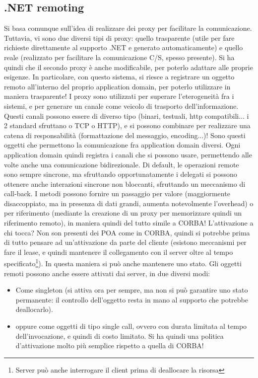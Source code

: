 \subsection{.NET remoting}
Si basa comunque sull'idea di realizzare dei proxy per facilitare la comunicazione.
Tuttavia, vi sono due diversi tipi di proxy: quello trasparente (utile per fare richieste direttamente al supporto .NET 
e generato automaticamente) e quello reale (realizzato per facilitare la comunicazione C/S, spesso presente). Si ha
quindi che il secondo proxy è anche modificabile, per poterlo adattare alle proprie esigenze. In particolare, con 
questo sistema, si riesce a registrare un oggetto remoto all'interno del proprio application domain, per poterlo 
utilizzare in maniera trasparente!
I proxy sono utilizzati per superare l'eterogeneità fra i sistemi, e per generare un canale come veicolo di trasporto 
dell'informazione. Questi canali possono essere di diverso tipo (binari, testuali, http compatibili... i 2 standard 
sfruttano o TCP o HTTP), e si possono combinare per realizzare una catena di responsabilità (formattazione del 
messaggio, encoding...)! Sono questi oggetti che permettono la comunicazione fra application domain diversi. Ogni 
application domain quindi registra i canali che si possono usare, permettendo alle volte anche una comunicazione 
bidirezionale.
Di default, le operazioni remote sono sempre sincrone, ma sfruttando opportunatamente i delegati si possono ottenere
anche interazioni sincrone non bloccanti, sfruttando un meccanismo di call-back. I metodi possono fornire un
passaggio per valore (maggiormente disaccoppiato, ma in presenza di dati grandi, aumenta notevolmente l'overhead) o per
riferimento (mediante la creazione di un proxy per memorizzare quindi un riferimento remoto), in maniera quindi del 
tutto simile a CORBA!
L'attivazione a chi tocca? Non son presenti dei POA come in CORBA, quindi si potrebbe prima di tutto pensare ad 
un'attivazione da parte del cliente (esistono meccanismi per fare il lease, e quindi mantenere il collegamento con il
server oltre al tempo specificato\footnote{Server può anche interrogare il client prima di deallocare la risorsa}). In
questa maniera si può anche mantenere uno stato.
Gli oggetti remoti possono anche essere attivati dai server, in due diversi modi:
\begin{itemize}
 \item Come singleton (si attiva ora per sempre, ma non si può garantire uno stato permanente: il controllo dell'oggetto 
 resta in mano al supporto che potrebbe deallocarlo).
 \item oppure come oggetti di tipo single call, ovvero con durata limitata al tempo dell'invocazione, e quindi di costo 
 limitato. Si ha quindi una politica d'attivazione molto più semplice rispetto a quella di CORBA!
\end{itemize}